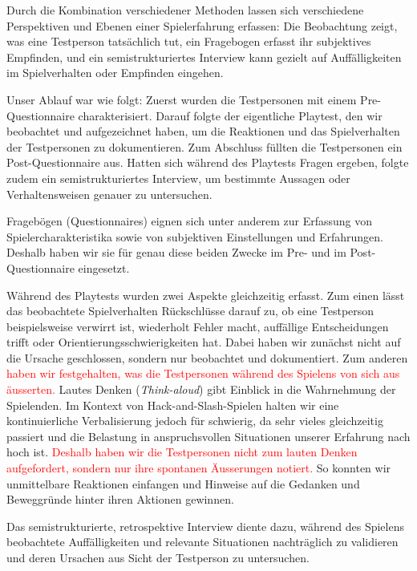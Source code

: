 \documentclass[../Main.tex]{subfiles}
\begin{document}
Durch die Kombination verschiedener Methoden lassen sich verschiedene Perspektiven und Ebenen einer Spielerfahrung erfassen: Die Beobachtung zeigt, was eine Testperson tatsächlich tut, ein Fragebogen erfasst ihr subjektives Empfinden, und ein semistrukturiertes Interview kann gezielt auf Auffälligkeiten im Spielverhalten oder Empfinden eingehen.\autocite[112]{drachen2018gamesuserresearch}

Unser Ablauf war wie folgt: Zuerst wurden die Testpersonen mit einem Pre-Questionnaire charakterisiert. Darauf folgte der eigentliche Playtest, den wir beobachtet und aufgezeichnet haben, um die Reaktionen und das Spielverhalten der Testpersonen zu dokumentieren. Zum Abschluss füllten die Testpersonen ein Post-Questionnaire aus. Hatten sich während des Playtests Fragen ergeben, folgte zudem ein semistrukturiertes Interview, um bestimmte Aussagen oder Verhaltensweisen genauer zu untersuchen.

Fragebögen (Questionnaires) eignen sich unter anderem zur Erfassung von Spielercharakteristika sowie von subjektiven Einstellungen und Erfahrungen.\autocite[142--143]{drachen2018gamesuserresearch} Deshalb haben wir sie für genau diese beiden Zwecke im Pre- und im Post-Questionnaire eingesetzt.

Während des Playtests wurden zwei Aspekte gleichzeitig erfasst. Zum einen lässt das beobachtete Spielverhalten Rückschlüsse darauf zu, ob eine Testperson beispielsweise verwirrt ist, wiederholt Fehler macht, auffällige Entscheidungen trifft oder Orientierungsschwierigkeiten hat. Dabei haben wir zunächst nicht auf die Ursache geschlossen, sondern nur beobachtet und dokumentiert. Zum anderen \textcolor{red}{haben wir festgehalten, was die Testpersonen während des Spielens von sich aus äusserten.} Lautes Denken (\textit{Think-aloud}) gibt Einblick in die Wahrnehmung der Spielenden.\autocite[189--190]{drachen2018gamesuserresearch} Im Kontext von Hack-and-Slash-Spielen halten wir eine kontinuierliche Verbalisierung jedoch für schwierig, da sehr vieles gleichzeitig passiert und die Belastung in anspruchsvollen Situationen unserer Erfahrung nach hoch ist. \textcolor{red}{Deshalb haben wir die Testpersonen nicht zum lauten Denken aufgefordert, sondern nur ihre spontanen Äusserungen notiert.} So konnten wir unmittelbare Reaktionen einfangen und Hinweise auf die Gedanken und Beweggründe hinter ihren Aktionen gewinnen.

Das semistrukturierte, retrospektive Interview diente dazu, während des Spielens beobachtete Auffälligkeiten und relevante Situationen nachträglich zu validieren und deren Ursachen aus Sicht der Testperson zu untersuchen.\autocite[164--167]{drachen2018gamesuserresearch}
\end{document}
